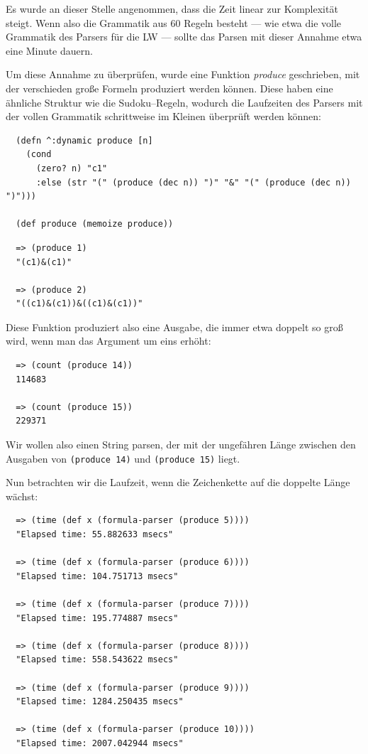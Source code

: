 \documentclass[ngerman,a4paper,abstracton,open=right,twoside=false,toc=listofnumbered,bibtotocnumbered]{scrreprt}
\begin{document}
Es wurde an dieser Stelle angenommen, dass die Zeit linear zur Komplexität steigt. Wenn also die Grammatik aus 60 Regeln besteht --- wie etwa die volle Grammatik des Parsers für die LW --- sollte das Parsen mit dieser Annahme etwa eine Minute dauern.

Um diese Annahme zu überprüfen, wurde eine Funktion \emph{produce} geschrieben, mit der verschieden große Formeln produziert werden können. Diese haben eine ähnliche Struktur wie die Sudoku--Regeln, wodurch die Laufzeiten des Parsers mit der vollen Grammatik schrittweise im Kleinen überprüft werden können:

\begin{lstlisting}
  (defn ^:dynamic produce [n]
    (cond
      (zero? n) "c1"
      :else (str "(" (produce (dec n)) ")" "&" "(" (produce (dec n)) ")")))

  (def produce (memoize produce))
\end{lstlisting}

\begin{lstlisting}
  => (produce 1)
  "(c1)&(c1)"

  => (produce 2)
  "((c1)&(c1))&((c1)&(c1))"
\end{lstlisting}

Diese Funktion produziert also eine Ausgabe, die immer etwa doppelt so groß wird, wenn man das Argument um eins erhöht:

\begin{lstlisting}
  => (count (produce 14))
  114683

  => (count (produce 15))
  229371
\end{lstlisting}

Wir wollen also einen String parsen, der mit der ungefähren Länge zwischen den Ausgaben von \lstinline|(produce 14)| und \lstinline|(produce 15)| liegt.

Nun betrachten wir die Laufzeit, wenn die Zeichenkette auf die doppelte Länge wächst:

\begin{lstlisting}
  => (time (def x (formula-parser (produce 5))))
  "Elapsed time: 55.882633 msecs"

  => (time (def x (formula-parser (produce 6))))
  "Elapsed time: 104.751713 msecs"

  => (time (def x (formula-parser (produce 7))))
  "Elapsed time: 195.774887 msecs"

  => (time (def x (formula-parser (produce 8))))
  "Elapsed time: 558.543622 msecs"

  => (time (def x (formula-parser (produce 9))))
  "Elapsed time: 1284.250435 msecs"

  => (time (def x (formula-parser (produce 10))))
  "Elapsed time: 2007.042944 msecs"
\end{lstlisting}
\end{document}
